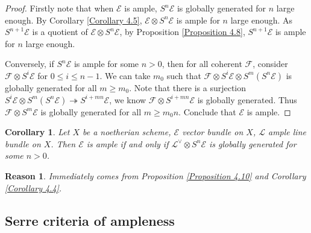 \documentclass{ctexart}
\newtheorem{reason}{Reason}[section]
\newtheorem{corollary}{Corollary}[section]
\begin{document}
\begin{proof}
    Firstly note that when $\mathcal{E}$ is ample, $S^{n}\mathcal{E}$ is globally generated for $n$ large enough.
    By Corollary \ref{Corollary 4.5}, $\mathcal{E} \otimes S^{n}\mathcal{E}$ is ample for $n$ large enough.
    As $S^{n + 1}\mathcal{E}$ is a quotient of $\mathcal{E} \otimes S^{n}\mathcal{E}$, by Proposition \ref{Proposition 4.8}, $S^{n + 1}\mathcal{E}$ is ample for $n$ large enough.
    \par
    Conversely, if $S^{n}\mathcal{E}$ is ample for some $n > 0$,
    then for all coherent $\mathcal{F}$, consider $\mathcal{F} \otimes S^{i}\mathcal{E}$ for $0 \le i \le n - 1$.
    We can take $m_{0}$ such that $\mathcal{F} \otimes S^{i}\mathcal{E} \otimes S^{m}(S^{n}\mathcal{E})$ is globally generated for all $m \ge m_{0}$.
    Note that there is a surjection $S^{i}\mathcal{E} \otimes S^{m}(S^{n}\mathcal{E}) \twoheadrightarrow S^{i + mn}\mathcal{E}$, we know $\mathcal{F} \otimes S^{i + mn}\mathcal{E}$ is globally generated.
    Thus $\mathcal{F} \otimes S^{m}\mathcal{E}$ is globally generated for all $m \ge m_{0}n$.
    Conclude that $\mathcal{E}$ is ample.
\end{proof}
\begin{corollary}
    Let $X$ be a noetherian scheme, $\mathcal{E}$ vector bundle on $X$, $\mathcal{L}$ ample line bundle on $X$.
    Then $\mathcal{E}$ is ample if and only if $\mathcal{L}^{\vee} \otimes S^{n}\mathcal{E}$ is globally generated for some $n > 0$.
    \label{Corollary 4.6}
\end{corollary}
\begin{reason}
    Immediately comes from Proposition \ref{Proposition 4.10} and Corollary \ref{Corollary 4.4}.
\end{reason}

\subsection{Serre criteria of ampleness}
\label{subsection:Ample_Vector_Bundles_Serre_criteria_of_ampleness}
\end{document}
